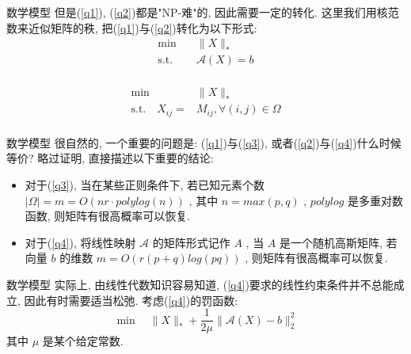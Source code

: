 \documentclass[slidestop, compress, mathserif, UTF8]{beamer}
\numberwithin{equation}{section}                                        %
\begin{document}
            \begin{frame}[t]{数学模型}
                但是(\ref{q1}), (\ref{q2})都是"NP-难"的, 因此需要一定的转化. 这里我们用核范数来近似矩阵的秩, 把(\ref{q1})与(\ref{q2})转化为以下形式:
                \begin{equation}
                    \begin{split}\label{q3}
                        \min \quad
                            & \lVert{X}\rVert_*\\
                        \text{s.t.} \quad
                            & \mathcal{A}(X) = b\\	
                    \end{split}
                \end{equation}
                
                \begin{equation}
                    \begin{split}\label{q4}
                        \min \quad
                            & \lVert{X}\rVert_*\\
                        \text{s.t.} \quad
                            X_{ij} = &M_{ij}, \forall(i,j)\in\Omega\\
                    \end{split}
                \end{equation}
            \end{frame}
            \begin{frame}[t]{数学模型 }
                很自然的, 一个重要的问题是: (\ref{q1})与(\ref{q3}), 或者(\ref{q2})与(\ref{q4})什么时候等价? 略过证明, 直接描述以下重要的结论:
                
                \begin{itemize}
                    \item 对于(\ref{q3}), 当在某些正则条件下, 若已知元素个数 $\lvert{\Omega}\rvert = m = O(nr \cdot polylog(n))$ , 其中 $n=max(p,q)$ , $polylog$ 是多重对数函数, 则矩阵有很高概率可以恢复.\\

                    \item 对于(\ref{q4}), 将线性映射 $\mathcal{A}$ 的矩阵形式记作 $A$ , 当 $A$ 是一个随机高斯矩阵, 若向量 $b$ 的维数 $m = O(r(p + q)log(pq))$ , 则矩阵有很高概率可以恢复.
                \end{itemize}
            \end{frame}
            \begin{frame}[t]{数学模型}
                实际上, 由线性代数知识容易知道, (\ref{q4})要求的线性约束条件并不总能成立, 因此有时需要适当松弛. 考虑(\ref{q4})的罚函数:
                \begin{equation}\label{q5}
                    \min \quad \lVert{X}\rVert_*+ \frac{1}{2\mu} \lVert{\mathcal{A}(X) - b}\rVert_2^2
                \end{equation}
                \small{其中 $\mu$ 是某个给定常数.}\normalsize
            \end{frame}
\end{document}

